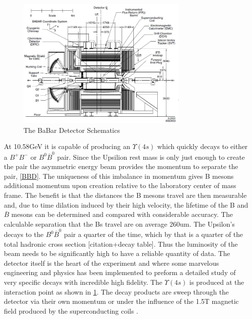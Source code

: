 \begin{figure}[h]
\centering
\includegraphics[width=0.75\textwidth]{figs/BBD.jpg}
\caption{The BaBar Detector Schematics}
\label{BBDa}
\end{figure}




At 10.58GeV it is capable of producing an $\Upsilon(4s)$ which quickly decays to either a $B^+B^-$ or $B^0\overline{B}^0$ pair. Since the Upsilion rest mass is only just enough to create the pair the asymmetric energy beam provides the momentum to separate the pair, \cref{BBD}.
The uniqueness of this imbalance in momentum gives B mesons additional momentum upon creation relative to the laboratory center of mass frame. The benefit is that the distances the B mesons travel are then measurable and, due to time dilation induced by their high velocity, the lifetime of the B and $\overline{B}$ mesons can be determined and compared with considerable accuracy. The calculable separation that the Bs travel are on average 260um. The Upsilon's decays to the $B^0 \overline{B}^0$ pair a quarter of the time, which by that is a quarter of the total hadronic cross section [citation+decay table]. Thus the luminosity of the beam needs to be significantly high to have a reliable quantity of data.
The detector itself is the heart of the experiment and where some marvelous engineering and physics has been implemented to preform a detailed study of very specific decays with incredible high fidelity. The $\Upsilon(4s)$ is produced at the interaction point as shown in \cref{BBDa}. The decay products are sweep through the detector via their own momentum or under the influence of the 1.5T magnetic field produced by the superconducting coils \cite{B5}. 

